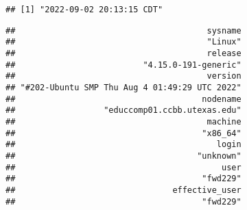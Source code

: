 \documentclass[
]{article}
\begin{document}
\begin{verbatim}
## [1] "2022-09-02 20:13:15 CDT"
\end{verbatim}

\begin{verbatim}
##                                       sysname 
##                                       "Linux" 
##                                       release 
##                          "4.15.0-191-generic" 
##                                       version 
## "#202-Ubuntu SMP Thu Aug 4 01:49:29 UTC 2022" 
##                                      nodename 
##                  "educcomp01.ccbb.utexas.edu" 
##                                       machine 
##                                      "x86_64" 
##                                         login 
##                                     "unknown" 
##                                          user 
##                                      "fwd229" 
##                                effective_user 
##                                      "fwd229"
\end{verbatim}
\end{document}
